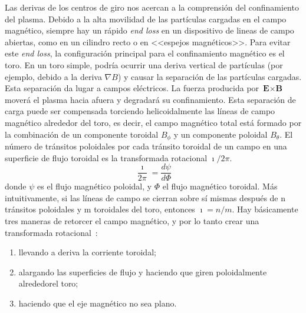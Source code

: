 \par
Las derivas de los centros de giro nos acercan a la comprensión del confinamiento del plasma. 
Debido a la alta movilidad de las partículas cargadas en el campo magnético, siempre hay un 
rápido \textit{end loss} en un dispositivo de lineas de campo abiertas, como en un cilindro recto o en 
<<espejos magnéticos>>. Para evitar este \textit{end loss}, la configuración principal para el 
confinamiento magnético es el toro. En un toro simple, podría ocurrir una deriva vertical de 
partículas (por ejemplo, debido a la deriva $\nabla B$) y causar la separación de las partículas 
cargadas. Esta separación da lugar a campos eléctricos. 
La fuerza producida por $\textbf{E}\times\textbf{B}$ moverá el plasma hacia afuera y degradará su confinamiento. 
Esta separación de carga puede ser compensada torciendo helicoidalmente las líneas 
de campo magnético alrededor del toro, es decir, el campo magnético total está formado por 
la combinación de un componente toroidal $B_\phi$ y un componente poloidal $B_\theta$. El número de 
tránsitos poloidales por cada tránsito toroidal de un campo en una superficie de flujo toroidal 
es la transformada rotacional $\imath/2\pi$.
\begin{equation}\label{eq:transrot}
    \frac{\imath}{2\pi}=\frac{d\psi}{d\Phi}
\end{equation}
donde $\psi$ es el flujo magnético poloidal, y $\Phi$ el flujo magnético toroidal. Más intuitivamente, si
las líneas de campo se cierran sobre sí mismas después de n tránsitos poloidales y m 
toroidales del toro, entonces $\imath=n/m$.\newpage
Hay básicamente tres maneras de retorcer el campo magnético, y por lo tanto crear una transformada rotacional~\cite{Helander_2012}:
\begin{enumerate}[(1)]
    \item llevando a deriva la corriente toroidal;
    \item alargando las superficies de flujo y haciendo que giren poloidalmente alrededorel toro;
    \item haciendo que el eje magnético no sea plano.
\end{enumerate}
